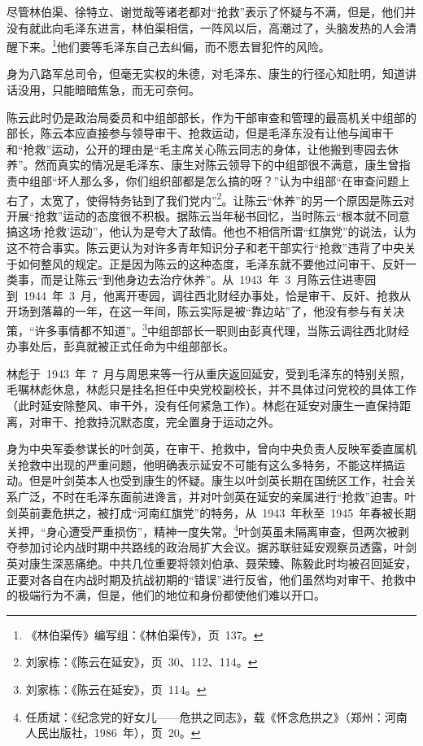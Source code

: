 尽管林伯渠、徐特立、谢觉哉等诸老都对“抢救”表示了怀疑与不满，但是，他们并没有就此向毛泽东进言，林伯渠相信，一阵风以后，高潮过了，头脑发热的人会清醒下来。\footnote{《林伯渠传》编写组：《林伯渠传》，页~137。}他们要等毛泽东自己去纠偏，而不愿去冒犯忤的风险。

身为八路军总司令，但毫无实权的朱德，对毛泽东、康生的行径心知肚明，知道讲话没用，只能暗暗焦急，而无可奈何。

陈云此时仍是政治局委员和中组部部长，作为干部审查和管理的最高机关中组部的部长，陈云本应直接参与领导审干、抢救运动，但是毛泽东没有让他与闻审干和“抢救”运动，公开的理由是“毛主席关心陈云同志的身体，让他搬到枣园去休养”。然而真实的情况是毛泽东、康生对陈云领导下的中组部很不满意，康生曾指责中组部“坏人那么多，你们组织部都是怎么搞的呀？”认为中组部“在审查问题上右了，太宽了，使得特务钻到了我们党内”\footnote{刘家栋：《陈云在延安》，页~30、112、114。}。让陈云“休养”的另一个原因是陈云对开展“抢救”运动的态度很不积极。据陈云当年秘书回忆，当时陈云“根本就不同意搞这场‘抢救’运动”，他认为是夸大了敌情。他也不相信所谓“红旗党”的说法，认为这不符合事实。陈云更认为对许多青年知识分子和老干部实行“抢救”违背了中央关于如何整风的规定。正是因为陈云的这种态度，毛泽东就不要他过问审干、反奸一类事，而是让陈云“到他身边去治疗休养”。从~1943~年~3~月陈云住进枣园到~1944~年~3~月，他离开枣园，调往西北财经办事处，恰是审干、反奸、抢救从开场到落幕的一年，在这一年间，陈云实际是被“靠边站”了，他没有参与有关决策，“许多事情都不知道”。\footnote{刘家栋：《陈云在延安》，页~114。}中组部部长一职则由彭真代理，当陈云调往西北财经办事处后，彭真就被正式任命为中组部部长。

林彪于~1943~年~7~月与周恩来等一行从重庆返回延安，受到毛泽东的特别关照，毛嘱林彪休息，林彪只是挂名担任中央党校副校长，并不具体过问党校的具体工作（此时延安除整风、审干外，没有任何紧急工作）。林彪在延安对康生一直保持距离，对审干、抢救持沉默态度，完全置身于运动之外。

身为中央军委参谋长的叶剑英，在审干、抢救中，曾向中央负责人反映军委直属机关抢救中出现的严重问题，他明确表示延安不可能有这么多特务，不能这样搞运动。但是叶剑英本人也受到康生的怀疑。康生以叶剑英长期在国统区工作，社会关系广泛，不时在毛泽东面前进谗言，并对叶剑英在延安的亲属进行“抢救”迫害。叶剑英前妻危拱之，被打成“河南红旗党”的特务，从~1943~年秋至~1945~年春被长期关押，“身心遭受严重损伤”，精神一度失常。\footnote{任质斌：《纪念党的好女儿——危拱之同志》，载《怀念危拱之》（郑州：河南人民出版社，1986~年），页~20。}叶剑英虽未隔离审查，但两次被剥夺参加讨论内战时期中共路线的政治局扩大会议。据苏联驻延安观察员透露，叶剑英对康生深恶痛绝。中共几位重要将领刘伯承、聂荣臻、陈毅此时均被召回延安，正要对各自在内战时期及抗战初期的“错误”进行反省，他们虽然均对审干、抢救中的极端行为不满，但是，他们的地位和身份都使他们难以开口。

